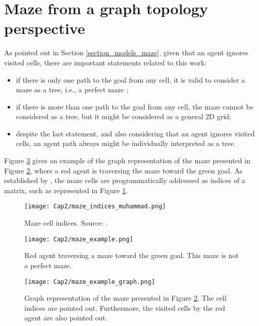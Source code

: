 \section{Maze from a graph topology perspective}
\label{section_models_maze_graph}
As pointed out in Section \ref{section_models_maze}, given that an agent ignores visited cells, there are important statements related to this work:

\begin{itemize}
\item if there is only one path to the goal from any cell, it is valid to consider a maze as a tree, i.e., a perfect maze \cite{Muhammad2021};

\item if there is more than one path to the goal from any cell, the maze cannot be considered as a tree, but it might be considered as a general 2D grid;

\item despite the last statement, and also considering that an agent ignores visited cells, an agent path always might be individually interpreted as a tree.
\end{itemize}

Figure \ref{maze_example_graph} gives an example of the graph representation of the maze presented in Figure \ref{maze_example}, where a red agent is traversing the maze toward the green goal. As established by , the maze cells are programmatically addressed as indices of a matrix, such as represented in Figure \ref{maze_indices_muhammad}.

\begin{figure}[ht!]
\centering
\texttt{[image: Cap2/maze\_indices\_muhammad.png]}
\caption{Maze cell indices. Source: .}
\label{maze_indices_muhammad}
\end{figure}

\begin{figure}[ht!]
\centering
\texttt{[image: Cap2/maze\_example.png]}
\caption{Red agent traversing a maze toward the green goal. This maze is not a perfect maze.}
\label{maze_example}
\end{figure}

\begin{figure}[ht!]
\centering
\texttt{[image: Cap2/maze\_example\_graph.png]}
\caption{Graph representation of the maze presented in Figure \ref{maze_example}. The cell indices are pointed out. Furthermore, the visited cells by the red agent are also pointed out.}
\label{maze_example_graph}
\end{figure}	

